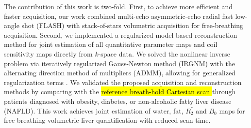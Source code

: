 \documentclass[journal,twoside,web]{ieeecolor}
\begin{document}
\marginnote[R2.13]

The contribution of this work is two-fold.
First, to achieve more efficient and faster acquisition, 
our work combined multi-echo asymmetric-echo radial fast low-angle shot (FLASH) 
with stack-of-stars volumetric acquisition \cite{block_2014_rad}
for free-breathing acquisition. 
Second, we implemented a regularized model-based reconstruction method 
for joint estimation of all quantitative parameter maps 
and coil sensitivity maps directly from $k$-space data. 
We solved the nonlinear inverse problem via 
iteratively regularized Gauss-Newton method (IRGNM) \cite{uecker_2008_nlinv} 
with the alternating direction method of multipliers (ADMM), 
allowing for generalized regularization terms \cite{boyd_2010_admm}. 
We validated the proposed acquisition and reconstruction methods by 
comparing with the \hl{reference breath-hold Cartesian scan \mbox{\cite{zhong_2014_wfadafit}}} 
through patients diagnosed with obesity, diabetes, or non-alcoholic fatty liver disease (NAFLD). 
This work achieves joint estimation of water, fat, $R_2^*$ and $B_0$ maps for free-breathing volumetric liver 
quantification with reduced scan time.









\end{document}
